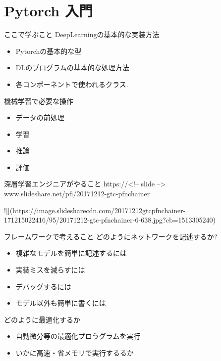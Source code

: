 \section{Pytorch 入門}

\begin{frame}[fragile]{ここで学ぶこと}
 DeepLearningの基本的な実装方法
 \begin{itemize}
  \item Pytorchの基本的な型
  \item DLのプログラムの基本的な処理方法
  \item 各コンポーネントで使われるクラス.
 \end{itemize}

\end{frame}
\begin{frame}[fragile]{機械学習で必要な操作}
\begin{itemize}
\item データの前処理
\item 学習
\item 推論
\item 評価
\end{itemize}

\end{frame}
\begin{frame}[fragile]{深層学習エンジニアがやること}
https://<!-- slide -->
www.slideshare.net/pfi/20171212-gtc-pfnchainer

![](https://image.slidesharecdn.com/20171212gtcpfnchainer-171215022416/95/20171212-gtc-pfnchainer-6-638.jpg?cb=1513305240)

\end{frame}
\begin{frame}[fragile]{フレームワークで考えること}
どのようにネットワークを記述するか?
\begin{itemize}
  \item 複雑なモデルを簡単に記述するには
  \item 実装ミスを減らすには
  \item デバッグするには
  \item モデル以外も簡単に書くには
\end{itemize}

どのように最適化するか
\begin{itemize}
  \item 自動微分等の最適化プロうグラムを実行
  \item いかに高速・省メモリで実行するるか
\end{itemize}
\end{frame}

